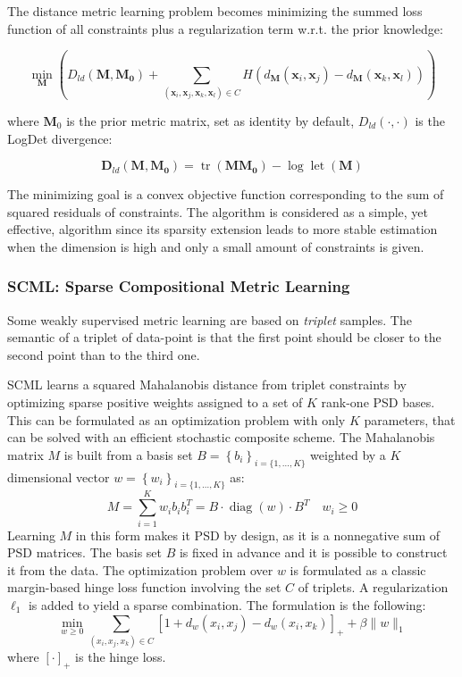 The distance metric learning problem becomes minimizing the summed loss function of all constraints plus a regularization term w.r.t. the prior knowledge:

$$
\min _{\mathbf{M}}\left(D_{l d}\left(\mathbf{M}, \mathbf{M}_{\mathbf{0}}\right)+\sum_{\left(\mathbf{x}_{i}, \mathbf{x}_{j}, \mathbf{x}_{k}, \mathbf{x}_{l}\right) \in C} H\left(d_{\mathbf{M}}\left(\mathbf{x}_{i}, \mathbf{x}_{j}\right)-d_{\mathbf{M}}\left(\mathbf{x}_{k}, \mathbf{x}_{l}\right)\right)\right)
$$

where $\mathbf{M}_{0}$ is the prior metric matrix, set as identity by default, $D_{l d}(\cdot, \cdot)$ is the LogDet divergence:

$$
\boldsymbol{D}_{l d}\left(\mathbf{M}, \mathbf{M}_{\mathbf{0}}\right)=\operatorname{tr}\left(\mathbf{M M}_{\mathbf{0}}\right)-\log \operatorname{let}(\mathbf{M})
$$

The minimizing goal is a convex objective function corresponding to the sum of squared residuals of constraints. The algorithm is considered as a simple, yet effective, algorithm since its sparsity extension leads to more stable estimation when the dimension is high and only a small amount of constraints is given.








\subsubsection{SCML: Sparse Compositional Metric Learning}

Some weakly supervised metric learning are based on \emph{triplet} samples. The semantic of a triplet of data-point is that the first point should be closer to the second point than to the third one.

SCML\cite{SCML} learns a squared Mahalanobis distance from triplet constraints by optimizing sparse positive weights assigned to a set of $K$ rank-one PSD bases. This can be formulated as an optimization problem with only $K$ parameters, that can be solved with an efficient stochastic composite scheme.
The Mahalanobis matrix $M$ is built from a basis set $B=\left\{b_{i}\right\}_{i=\{1, \ldots, K\}}$ weighted by a $K$ dimensional vector $w=\left\{w_{i}\right\}_{i=\{1, \ldots, K\}}$ as:
$$
M=\sum_{i=1}^{K} w_{i} b_{i} b_{i}^{T}=B \cdot \operatorname{diag}(w) \cdot B^{T} \quad w_{i} \geq 0
$$
Learning $M$ in this form makes it PSD by design, as it is a nonnegative sum of PSD matrices. The basis set $B$ is fixed in advance and it is possible to construct it from the data. The optimization problem over $w$ is formulated as a classic margin-based hinge loss function involving the set $C$ of triplets. A regularization $\ell_{1}$ is added to yield a sparse combination. The formulation is the following:
$$
\min _{w \geq 0} \sum_{\left(x_{i}, x_{j}, x_{k}\right) \in C}\left[1+d_{w}\left(x_{i}, x_{j}\right)-d_{w}\left(x_{i}, x_{k}\right)\right]_{+}+\beta\|w\|_{1}
$$
where $[\cdot]_{+}$ is the hinge loss.




